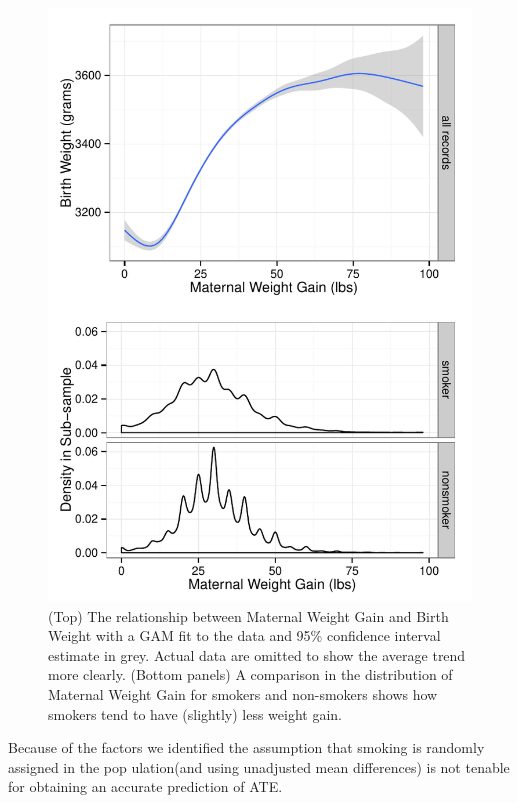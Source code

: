 \documentclass[a4paper, 12pt]{article}
\begin{document}
\begin{itemize}
\begin{figure}[htbp]
\begin{center}
\includegraphics{img/bw-gain.pdf}
\caption{(Top) The relationship between Maternal Weight Gain and Birth Weight with a GAM fit to the data and 95\% confidence interval estimate in grey.  Actual data are omitted to show the average trend more clearly.  (Bottom panels) A comparison in the distribution of Maternal Weight Gain for smokers and non-smokers shows how smokers tend to have (slightly) less weight gain.}
\label{fig:bwGain}
\end{center}
\end{figure}

\end{itemize}
Because of the factors we identified the assumption that smoking is randomly assigned in the pop ulation(and using unadjusted mean differences) is not tenable for obtaining an accurate prediction of ATE. 
\end{document}
